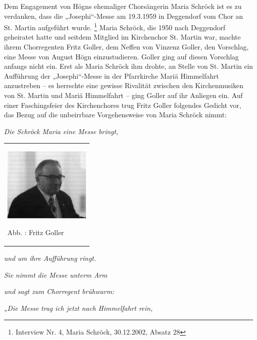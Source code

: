 \documentclass[a4paper]{article}
\newcommand\zitat[1]{\textit{#1}}
\newcounter{Abb}
\renewcommand\theAbb{\arabic{Abb}}
\begin{document}
Dem Engagement von Högns ehemaliger Chorsängerin Maria Schröck ist es zu
verdanken, dass die „Josephi“-Messe am 19.3.1959 in Deggendorf vom Chor
an St. Martin aufgeführt wurde. \footnote{Interview Nr. 4, Maria
Schröck, 30.12.2002, Absatz 28} Maria Schröck, die 1950 nach Deggendorf
geheiratet hatte und seitdem Mitglied im Kirchenchor St. Martin war,
machte ihrem Chorregenten Fritz Goller, dem Neffen von Vinzenz Goller,
den Vorschlag, eine Messe von August Högn einzustudieren. Goller ging
auf diesen Vorschlag anfangs nicht ein. Erst als Maria Schröck ihm
drohte, an Stelle von St. Martin ein Aufführung der „Josephi“-Messe in
der Pfarrkirche Mariä Himmelfahrt anzustreben – es herrschte eine
gewisse Rivalität zwischen den Kirchenmusiken von St. Martin und Mariä
Himmelfahrt – ging Goller auf ihr Anliegen ein. Auf einer
Faschingsfeier des Kirchenchores trug Fritz Goller folgendes Gedicht
vor, das Bezug auf die unbeirrbare Vorgehensweise von Maria Schröck
nimmt:

\zitat{Die Schröck Maria eine Messe bringt, }

\begin{center}
\begin{minipage}{4.598cm}
\begin{flushleft}
\tablefirsthead{}
\tablehead{}
\tabletail{}
\tablelasttail{}
\begin{supertabular}{m{4.3980002cm}}

\includegraphics[width=4.216cm,height=3.577cm]{pictures/zulassungsarbeit-img107.jpg}

Abb. \stepcounter{Abb}{\theAbb}: Fritz Goller \\
\end{supertabular}
\end{flushleft}
\end{minipage}
\end{center}
\zitat{und um ihre Aufführung ringt.}

\zitat{Sie nimmt die Messe unterm Arm}

\zitat{und sagt zum Chorregent brühwarm:}

\zitat{„Die Messe trag ich jetzt nach Himmelfahrt rein,}
\end{document}
